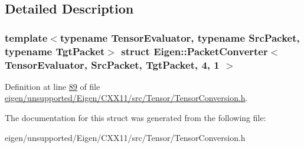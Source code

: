 \subsection{Detailed Description}
\subsubsection*{template$<$typename Tensor\+Evaluator, typename Src\+Packet, typename Tgt\+Packet$>$\newline
struct Eigen\+::\+Packet\+Converter$<$ Tensor\+Evaluator, Src\+Packet, Tgt\+Packet, 4, 1 $>$}



Definition at line \hyperlink{eigen_2unsupported_2_eigen_2_c_x_x11_2src_2_tensor_2_tensor_conversion_8h_source_l00089}{89} of file \hyperlink{eigen_2unsupported_2_eigen_2_c_x_x11_2src_2_tensor_2_tensor_conversion_8h_source}{eigen/unsupported/\+Eigen/\+C\+X\+X11/src/\+Tensor/\+Tensor\+Conversion.\+h}.



The documentation for this struct was generated from the following file\+:\begin{DoxyCompactItemize}
\item 
eigen/unsupported/\+Eigen/\+C\+X\+X11/src/\+Tensor/\+Tensor\+Conversion.\+h\end{DoxyCompactItemize}
